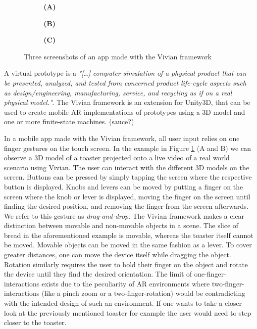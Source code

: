 \documentclass[11pt, a4paper]{article}
\begin{document}
\begin{figure}[H]
			\begin{subfigure}[t]{.32\textwidth}\centering
				\textbf{(A)}
			\end{subfigure}
			\begin{subfigure}[t]{.32\textwidth}\centering
				\textbf{(B)}
			\end{subfigure}
			\begin{subfigure}[t]{.32\textwidth}\centering
				\textbf{(C)}
			\end{subfigure}
			\caption{Three screenshots of an app made with the Vivian framework}
			\label{fig:feedbackonphone}
		\end{figure}

		A virtual prototype is a \textit{"\textnormal{[…]} computer simulation of a physical product that can be presented, analyzed, and tested from concerned product life-cycle aspects such as design/engineering, manufacturing, service, and recycling as if on a real physical model."}\cite{Wang2002}. The Vivian framework is an extension for Unity3D, that can be used to create mobile \ac{AR} implementations of prototypes using a 3D model and one or more finite-state machines. (sauce?)

		In a mobile app made with the Vivian framework, all user input relies on one finger gestures on the touch screen. In the example in Figure \ref{fig:feedbackonphone} (A and B) we can observe a 3D model of a toaster projected onto a live video of a real world scenario using Vivian. The user can interact with the different 3D models on the screen. Buttons can be pressed by simply tapping the screen where the respective button is displayed. Knobs and levers can be moved by putting a finger on the screen where the knob or lever is displayed, moving the finger on the screen until finding the desired position, and removing the finger from the screen afterwards. We refer to this gesture as \emph{drag-and-drop}. The Vivian framework makes a clear distinction between movable and non-movable objects in a scene. The slice of bread in the aforementioned example is movable, whereas the toaster itself cannot be moved. Movable objects can be moved in the same fashion as a lever. To cover greater distances, one can move the device itself while dragging the object. Rotation similarly requires the user to hold their finger on the object and rotate the device until they find the desired orientation. The limit of one-finger-interactions exists due to the peculiarity of \ac{AR} environments where two-finger-interactions (like a pinch zoom or a two-finger-rotation) would be contradicting with the intended design of such an environment. If one wants to take a closer look at the previously mentioned toaster for example the user would need to step closer to the toaster.
\end{document}
